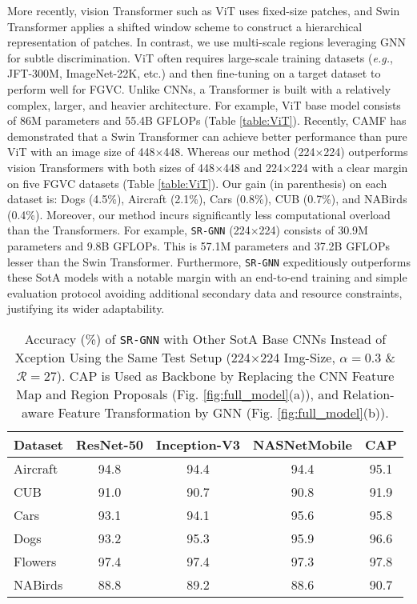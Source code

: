 \documentclass[journal]{IEEEtran}
\begin{document}
More recently, vision Transformer such as ViT \cite{dosovitskiy2020image} uses fixed-size patches, and Swin Transformer \cite{liu2021swin} applies a shifted window scheme to construct a hierarchical representation of patches. In contrast, we use multi-scale regions leveraging  GNN for subtle discrimination. ViT often requires large-scale training datasets (\textit{e.g.}, JFT-300M, ImageNet-22K, etc.) and then fine-tuning on a target dataset to perform well for FGVC. Unlike CNNs, a Transformer is built with a relatively complex, larger, and heavier architecture. For example, ViT base model consists of 86M parameters and 55.4B GFLOPs (Table \ref{table:ViT}). Recently, CAMF \cite{miao2021complemental} has demonstrated that a Swin Transformer can achieve better performance than pure ViT with an image size of 448$\times$448. Whereas our method (224$\times$224) outperforms vision Transformers with both sizes of 448$\times$448 and 224$\times$224 with a clear margin on five FGVC datasets (Table \ref{table:ViT}). Our gain (in parenthesis) on each dataset is: Dogs (4.5\%), Aircraft (2.1\%), Cars (0.8\%), CUB (0.7\%), and NABirds (0.4\%). Moreover, our method incurs significantly less computational overload than the Transformers. For example, \texttt{SR-GNN} (224$\times$224) consists of 30.9M parameters and 9.8B GFLOPs. This is 57.1M parameters and 37.2B GFLOPs lesser than the Swin Transformer. Furthermore, \texttt{SR-GNN} expeditiously outperforms these SotA models with a notable margin with an end-to-end training and simple evaluation protocol avoiding additional secondary data and resource constraints, justifying its wider adaptability. 
\begin{table} [t]
\begin{center}
 \caption{Accuracy (\%) of \texttt{SR-GNN} with Other SotA Base CNNs Instead of Xception Using the Same Test Setup (224$\times$224 Img-Size, $\alpha=0.3$ \& $\mathcal{R}=27$). CAP is Used as Backbone by Replacing the CNN Feature Map and Region Proposals (Fig. \ref{fig:full_model}(a)), and  Relation-aware Feature Transformation by GNN (Fig. \ref{fig:full_model}(b)).}
 \label{table:baseCNN}
\begin{tabular}{|l| c c c |c|}
 \hline
Dataset & ResNet-50 & Inception-V3 & NASNetMobile & CAP\\
\hline
  Aircraft &94.8 & 94.4 & 94.4 & 95.1 \\
  CUB &91.0 & 90.7 & 90.8 & 91.9 \\
  Cars & 93.1 & 94.1 & 95.6 & 95.8\\
  Dogs & 93.2 & 95.3 &95.9 & 96.6\\ 
  Flowers &97.4 & 97.4 & 97.3 & 97.8\\
  NABirds &88.8 & 89.2 & 88.6 & 90.7\\
\hline
\end{tabular}
 \end{center}
 \vspace{-0.4 cm}
\end{table}
\end{document}
